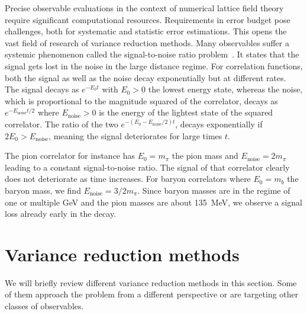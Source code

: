 Precise observable evaluations in the context of numerical lattice field theory require significant computational resources.
Requirements in error budget pose challenges, both for systematic and statistic error estimations.
This opens the vast field of research of variance reduction methods.
Many observables suffer a systemic phenomenon called the signal-to-noise ratio problem~\cite{parisi1984,lepage1989}.
It states that the signal gets lost in the noise in the large distance regime.
For correlation functions, both the signal as well as the noise decay exponentially but at different rates.
The signal decays as $e^{-E_0 t}$ with $E_0 > 0$ the lowest energy state, whereas the noise, which is proportional to the magnitude squared of the correlator, decays as $e^{-E_{\text{noise}}t/2}$ where $E_{\text{noise}} > 0$ is the energy of the lightest state of the squared correlator.
The ratio of the two $e^{-(E_0 - E_{\text{noise}}/2)t}$, decays exponentially if $2E_0 > E_{\text{noise}}$, meaning the signal deteriorates for large times $t$.

The pion correlator for instance has $E_0 = m_{\pi}$ the pion mass and $E_{\text{noise}} = 2 m_{\pi}$ leading to a constant signal-to-noise ratio.
The signal of that correlator clearly does not deteriorate as time increases.
For baryon correlators where $E_0 = m_{b}$ the baryon mass, we find $E_{\text{noise}} = 3/2 m_{\pi}$.
Since baryon masses are in the regime of one or multiple GeV and the pion masses are about \SI{135}{\mega \eV}, we observe a signal loss already early in the decay.

\section{Variance reduction methods}

We will briefly review different variance reduction methods in this section.
Some of them approach the problem from a different perspective or are targeting other classes of observables.

